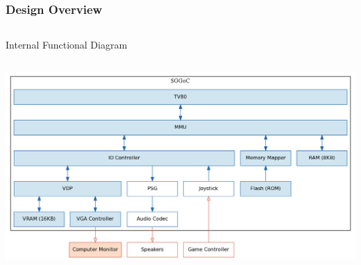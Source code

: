 \documentclass[xcolor=table]{beamer}
\begin{document}
\begin{frame}
    \frametitle{Design Overview}
    \begin{columns}[c]
        \vspace{-0.8cm}
        Internal Functional Diagram
    \end{columns}
    \begin{center}
        \includegraphics[scale=0.3]{../block_diagrams/block_diagram_internal_implemented.png}
    \end{center}
\end{frame}
\end{document}

